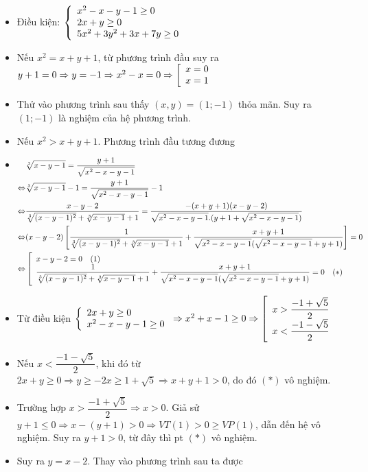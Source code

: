 \lgi 
\begin{itemize}[label=,leftmargin=*]
\item Điều kiện: $\left\{\begin{array}{ll}x^2-x-y-1\ge 0 \\ 2x+y \ge 0 \\ 5x^2+3y^2+3x+7y\ge 0\end{array}\right.$
\item Nếu $x^2=x+y+1$, từ phương trình đầu suy ra $y+1=0\Rightarrow y=-1\Rightarrow x^2-x=0 \Rightarrow \left[\begin{array}{ll}x=0\\ x=1\end{array}\right.$
\item Thử vào phương trình sau thấy $(x,y)=(1;-1)$ thỏa mãn. Suy ra $(1;-1)$ là nghiệm của hệ phương trình.
\item Nếu $x^2>x+y+1$. Phương trình đầu tương đương
\item $\begin{aligned}[t]&\sqrt[3]{x-y-1}=\dfrac{y+1}{\sqrt{x^2-x-y-1}}\\ 
\Leftrightarrow &\sqrt[3]{x-y-1}-1=\dfrac{y+1}{\sqrt{x^2-x-y-1}}-1 \\
\Leftrightarrow &\dfrac{x-y-2}{\sqrt[3]{(x-y-1)^2}+\sqrt[3]{x-y-1}+1} = \dfrac{-(x+y+1)(x-y-2)}{\sqrt{x^2-x-y-1}.(y+1+\sqrt{x^2-x-y-1})} \\
\Leftrightarrow &(x-y-2)\left[\dfrac{1}{\sqrt[3]{(x-y-1)^2}+\sqrt[3]{x-y-1}+1}+\dfrac{x+y+1}{\sqrt{x^2-x-y-1}(\sqrt{x^2-x-y-1}+y+1)}\right]=0\\
\Leftrightarrow &\left[\begin{array}{ll}x-y-2=0 \quad (1) \\ \dfrac{1}{\sqrt[3]{(x-y-1)^2}+\sqrt[3]{x-y-1}+1}+\dfrac{x+y+1}{\sqrt{x^2-x-y-1}(\sqrt{x^2-x-y-1}+y+1)}=0 \quad (*)\end{array}\right.\\
 \end{aligned}$
\item Từ điều kiện $\left\{\begin{array}{ll}2x+y\ge 0 \\ x^2-x-y-1 \ge 0\end{array}\right.\Rightarrow x^2+x-1\ge 0\Rightarrow \left[\begin{array}{ll}x>\dfrac{-1+\sqrt{5}}{2} \\ x<\dfrac{-1-\sqrt{5}}{2}\end{array}\right.$
\item Nếu $x<\dfrac{-1-\sqrt{5}}{2}$, khi đó từ $2x+y\ge 0 \Rightarrow y \ge -2x\ge 1+\sqrt{5}\Rightarrow x+y+1 >0$, do đó $(*)$ vô nghiệm.
\item Trường hợp $x>\dfrac{-1+\sqrt{5}}{2} \Rightarrow x>0$. Giả sử $y+1 \le 0 \Rightarrow x-(y+1)>0 \Rightarrow VT(1) >0 \ge VP(1)$, dẫn đến hệ vô nghiệm. Suy ra $y+1>0$, từ đây thì pt $(*)$ vô nghiệm.
\item Suy ra $y=x-2$. Thay vào phương trình sau ta được 

\end{itemize}
